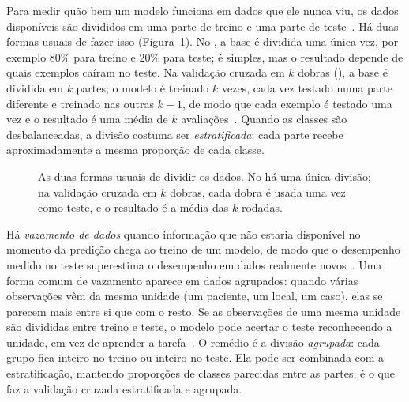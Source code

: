 Para medir quão bem um modelo funciona em dados que ele nunca viu, os dados disponíveis são divididos em uma parte de treino e uma parte de teste~\cite{hastie2009elements}. Há duas formas usuais de fazer isso (Figura~\ref{fig:holdout_kfold}). No , a base é dividida uma única vez, por exemplo 80\% para treino e 20\% para teste; é simples, mas o resultado depende de quais exemplos caíram no teste. Na validação cruzada em $k$ dobras (), a base é dividida em $k$ partes; o modelo é treinado $k$ vezes, cada vez testado numa parte diferente e treinado nas outras $k-1$, de modo que cada exemplo é testado uma vez e o resultado é uma média de $k$ avaliações~\cite{kohavi1995study}. Quando as classes são desbalanceadas, a divisão costuma ser \emph{estratificada}: cada parte recebe aproximadamente a mesma proporção de cada classe.

\begin{figure}[htpb]
\centering
{}
\caption{As duas formas usuais de dividir os dados. No  há uma única divisão; na validação cruzada em $k$ dobras, cada dobra é usada uma vez como teste, e o resultado é a média das $k$ rodadas.}
\label{fig:holdout_kfold}
\end{figure}

Há \emph{vazamento de dados} quando informação que não estaria disponível no momento da predição chega ao treino de um modelo, de modo que o desempenho medido no teste superestima o desempenho em dados realmente novos~\cite{kapoor2023leakage}. Uma forma comum de vazamento aparece em dados agrupados: quando várias observações vêm da mesma unidade (um paciente, um local, um caso), elas se parecem mais entre si que com o resto. Se as observações de uma mesma unidade são divididas entre treino e teste, o modelo pode acertar o teste reconhecendo a unidade, em vez de aprender a tarefa~\cite{roberts2017cross}. O remédio é a divisão \emph{agrupada}: cada grupo fica inteiro no treino ou inteiro no teste. Ela pode ser combinada com a estratificação, mantendo proporções de classes parecidas entre as partes; é o que faz a validação cruzada estratificada e agrupada.

